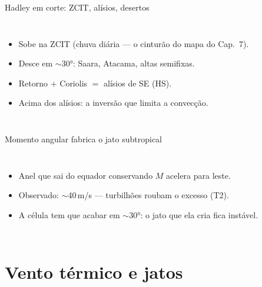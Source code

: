 \documentclass[aspectratio=169,11pt]{beamer}
\begin{document}
\begin{frame}{Hadley em corte: ZCIT, alísios, desertos}
  \begin{columns}
    \begin{itemize}
      \item Sobe na ZCIT (chuva diária — o cinturão do mapa do
            Cap.~7).
      \item Desce em $\sim$30°: Saara, Atacama, altas semifixas.
      \item Retorno $+$ Coriolis $=$ alísios de SE (HS).
      \item Acima dos alísios: a inversão que limita a convecção.
    \end{itemize}
  \end{columns}
\end{frame}

\begin{frame}{Momento angular fabrica o jato subtropical}
  \begin{columns}
    \vspace{0.4em}
    \begin{itemize}
      \item Anel que sai do equador conservando $M$ acelera para
            leste.
      \item Observado: $\sim$40\,m/s — turbilhões roubam o excesso
            (T2).
      \item A célula \alert{tem} que acabar em $\sim$30°: o jato que
            ela cria fica instável.
    \end{itemize}
  \end{columns}
\end{frame}

\section{Vento térmico e jatos}
\end{document}
